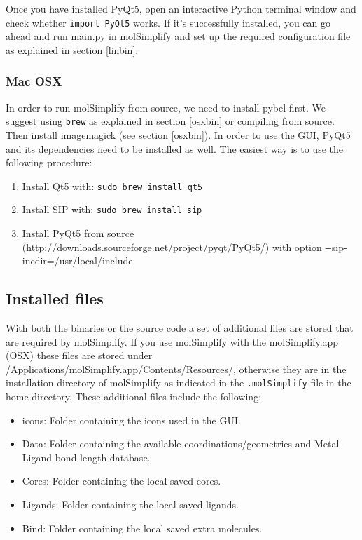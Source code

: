 \documentclass[a4paper,12pt]{assignment}
\begin{document}
Once you have installed PyQt5, open an interactive Python terminal window and check whether \texttt{import PyQt5} works. If it's successfully installed, you can go ahead and run main.py in molSimplify and set up the required configuration file as explained in section \ref{linbin}.

\subsubsection{Mac OSX}

In order to run molSimplify from source, we need to install pybel first. We suggest using \texttt{brew} as explained in section \ref{osxbin} or compiling from source. Then install imagemagick (see section \ref{osxbin}). In order to use the GUI, PyQt5 and its dependencies need to be installed as well. The easiest way is to use the following procedure:

\begin{enumerate}
\item Install Qt5 with: \texttt{sudo brew install qt5}
\item Install SIP with: \texttt{sudo brew install sip}
\item Install PyQt5 from source (\url{http://downloads.sourceforge.net/project/pyqt/PyQt5/}) with option -\hspace{0.02cm}-sip-incdir=/usr/local/include
\end{enumerate}

\subsection{Installed files}

With both the binaries or the source code a set of additional files are stored that are required by molSimplify. If you use molSimplify with the molSimplify.app (OSX) these files are stored under /Applications/molSimplify.app/Contents/Resources/, otherwise they are in the installation directory of molSimplify as indicated in the \texttt{.molSimplify} file in the home directory. These additional files include the following:
\begin{itemize}
\item icons: Folder containing the icons used in the GUI.
\item Data: Folder containing the available coordinations/geometries and Metal-Ligand bond length database.
\item Cores: Folder containing the local saved cores.
\item Ligands: Folder containing the local saved ligands.
\item Bind: Folder containing the local saved extra molecules.
\end{itemize}
\end{document}
